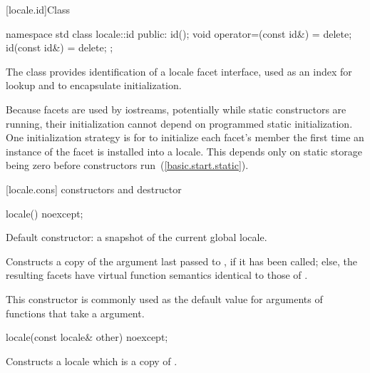 [locale.id]{Class }

%
\begin{codeblock}
namespace std {
  class locale::id {
  public:
    id();
    void operator=(const id&) = delete;
    id(const id&) = delete;
  };
}
\end{codeblock}

\pnum
The class  provides identification of a locale facet
interface, used as an index for lookup
and to encapsulate initialization.

\pnum
\begin{note}
Because facets are used by iostreams, potentially while static constructors are
running, their initialization cannot depend on programmed static
initialization.
One initialization strategy is for
to initialize each facet's
member the first time an instance of the facet is installed into a locale.
This depends only on static storage being zero before constructors run~(\ref{basic.start.static}).
\end{note}

[locale.cons]{ constructors and destructor}

%
\begin{itemdecl}
locale() noexcept;
\end{itemdecl}

\begin{itemdescr}
\pnum
Default constructor: a snapshot of the current global locale.

\pnum
\effects
Constructs a copy of the argument last passed to
,
if it has been called; else, the resulting facets have virtual
function semantics identical to those of
.
\begin{note}
This constructor is commonly used as the default value for arguments
of functions that take a
argument.
\end{note}
\end{itemdescr}

%
\begin{itemdecl}
locale(const locale& other) noexcept;
\end{itemdecl}

\begin{itemdescr}
\pnum
\effects
Constructs a locale which is a copy of .
\end{itemdescr}

